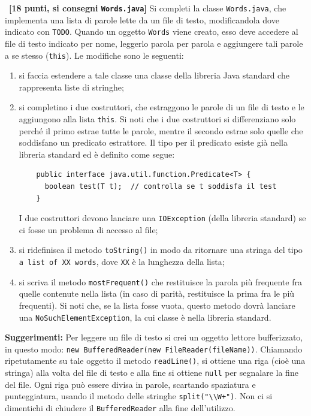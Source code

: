 \documentclass[12pt]{article}
\newcounter{esnu}
\newenvironment{esercizio}{\medskip \noindent {\bf Esercizio\addtocounter{esnu}{1} \arabic{esnu}}}{}
\begin{document}
\begin{esercizio}~\textbf{[18 punti, si consegni \texttt{Words.java}]}
  Si completi la classe \texttt{Words.java}, che implementa una lista di parole
  lette da un file di testo, modificandola dove indicato con \texttt{TODO}.
  Quando un oggetto \texttt{Words} viene creato, esso
  deve accedere al file di testo
  indicato per nome, leggerlo parola per parola e aggiungere tali parole
  a se stesso (\texttt{this}). Le modifiche sono le seguenti:
  \begin{enumerate}
  \item si faccia estendere a tale classe una classe della libreria Java
    standard che rappresenta liste di stringhe;
  \item si completino i due costruttori, che estraggono le parole
    di un file di testo e le aggiungono alla lista \texttt{this}. Si noti che
    i due costruttori si differenziano solo perch\'e il primo estrae
    tutte le parole, mentre il secondo estrae solo quelle che soddisfano
    un predicato estrattore. Il tipo per il predicato
    esiste gi\`a nella libreria
    standard ed \`e definito come segue:
    \begin{lstlisting}
    public interface java.util.function.Predicate<T> {
      boolean test(T t);  // controlla se t soddisfa il test
    }
    \end{lstlisting}
    I due costruttori devono lanciare una
    \texttt{IOException} (della libreria standard) se ci fosse
    un problema di accesso al file;
  \item si ridefinisca il metodo \texttt{toString()} in modo da ritornare
    una stringa del tipo \texttt{a list of XX words}, dove \texttt{XX} \`e
    la lunghezza della lista;
  \item si scriva il metodo \texttt{mostFrequent()} che restituisce la
    parola pi\`u frequente fra quelle contenute nella lista
    (in caso di parit\`a, restituisce la prima fra le pi\`u frequenti).
    Si noti che, se la lista fosse vuota, questo metodo dovr\`a
    lanciare una \texttt{NoSuchElementException}, la cui classe \`e nella
    libreria standard.
  \end{enumerate}
  \textbf{Suggerimenti:} Per leggere un file di testo si crei un
  oggetto lettore bufferizzato, in questo modo:
  \texttt{new BufferedReader(new FileReader(fileName))}.
  Chiamando ripetutamente su tale oggetto il metodo
  \texttt{readLine()}, si ottiene una riga (cio\`e una stringa)
  alla volta del file di
  testo e alla fine si ottiene \texttt{null} per segnalare la fine del file.
  Ogni riga pu\`o essere divisa in parole, scartando spaziatura e
  punteggiatura, usando il metodo delle stringhe
  \verb!split("\\W+")!.
  Non ci si dimentichi di chiudere il \texttt{BufferedReader}
  alla fine dell'utilizzo.
\end{esercizio}
\end{document}
